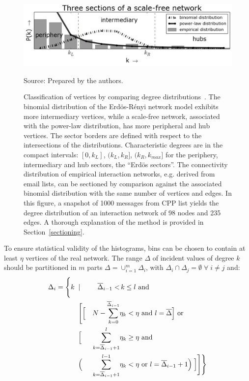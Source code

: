 \clearpage
\begin{figure}[!h]
\centering
\caption{Classification of vertices by comparing degree
distributions~\cite{3setores}.
The binomial distribution of the Erd\"os-R\'enyi network model exhibits more intermediary vertices, while a scale-free network, associated with the power-law distribution, has more peripheral and hub vertices. The sector borders are defined with respect to the intersections of the distributions. Characteristic degrees are in the compact intervals: $[0,k_L]$, $(k_L,k_R]$, $(k_R,k_{max}]$ for the periphery, intermediary and hub sectors, the ``Erd\"os sectors''.
The connectivity distribution of empirical interaction networks, e.g. derived from email lists, can be sectioned by comparison against the associated binomial distribution with the same number of vertices and edges. In this figure, a snapshot of 1000 messages from CPP list yields the degree distribution of an interaction network of 98 nodes and 235 edges. A thorough explanation of the method is provided in Section~\ref{sectioning}.}
\includegraphics[width=\textwidth]{figs/fser__}
\label{fig:setores}
\begin{flushleft}
		Source: Prepared by the authors.\
\end{flushleft}
\end{figure}

To ensure statistical validity of the histograms, bins can be chosen to contain at least $\eta$ vertices of the real network.
The range $\Delta$ of incident values of degree $k$ should be partitioned in $m$ parts $\Delta=\cup_{i=1}^m \Delta_i$,
with $\Delta_i\cap \Delta_j=\emptyset \; \forall\; i \neq j$ and:
\begin{align}
\Delta_i =\Biggl\{ k\;\; & | & \overline{\Delta}_{i-1}< &\, k\leq l \text{ and }\;\;\;\;\;\;\;\;\;\;\;\;\nonumber\\
                         & \Biggl[ \Bigl[ & N - \sum_{k=0}^{\overline{\Delta}_{i-1}} & \eta_k< \eta \text{ and } l = \overline{\Delta} \Bigr] \text{ or }\\
&	\Bigl[ & \sum_{k=\overline{\Delta}_{i-1}+1}^l &  \eta_k \geq \eta \text{ and }\;\;\;\;\;\;\nonumber\\
& \Bigl( &\sum_{k=\overline{\Delta}_{i-1}+1}^{l-1} &  \eta_k < \eta \text{ or }   l=\overline{\Delta}_{i-1}+1 \Bigr) \;\Bigr] \Biggr] \Biggr\}\nonumber
\end{align}

